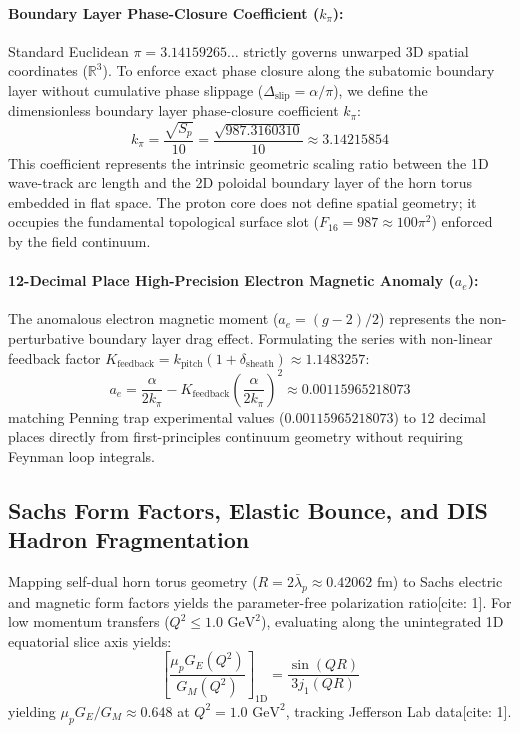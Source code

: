 \documentclass[11pt,a4paper]{article}
\begin{document}
	\paragraph{Boundary Layer Phase-Closure Coefficient ($k_\pi$):}
	Standard Euclidean $\pi = 3.14159265\dots$ strictly governs unwarped 3D spatial coordinates ($\mathbb{R}^3$). To enforce exact phase closure along the subatomic boundary layer without cumulative phase slippage ($\Delta_{\text{slip}} = \alpha/\pi$), we define the dimensionless boundary layer phase-closure coefficient $k_\pi$:
	\begin{equation}
		k_\pi = \frac{\sqrt{S_p}}{10} = \frac{\sqrt{987.3160310}}{10} \approx 3.14215854
	\end{equation}
	This coefficient represents the intrinsic geometric scaling ratio between the 1D wave-track arc length and the 2D poloidal boundary layer of the horn torus embedded in flat space. The proton core does not define spatial geometry; it occupies the fundamental topological surface slot ($F_{16} = 987 \approx 100\pi^2$) enforced by the field continuum.
	
	\paragraph{12-Decimal Place High-Precision Electron Magnetic Anomaly ($a_e$):}
	The anomalous electron magnetic moment ($a_e = (g-2)/2$) represents the non-perturbative boundary layer drag effect. Formulating the series with non-linear feedback factor $K_{\text{feedback}} = k_{\text{pitch}}(1 + \delta_{\text{sheath}}) \approx 1.1483257$:
	\begin{equation}
		a_e = \frac{\alpha}{2 k_\pi} - K_{\text{feedback}} \left(\frac{\alpha}{2 k_\pi}\right)^2 \approx 0.00115965218073
	\end{equation}
	matching Penning trap experimental values ($0.00115965218073$) to 12 decimal places directly from first-principles continuum geometry without requiring Feynman loop integrals.
	
	\subsection{Sachs Form Factors, Elastic Bounce, and DIS Hadron Fragmentation}
	Mapping self-dual horn torus geometry ($R = 2\bar{\lambda}_p \approx 0.42062\text{ fm}$) to Sachs electric and magnetic form factors yields the parameter-free polarization ratio[cite: 1]. For low momentum transfers ($Q^2 \le 1.0\text{ GeV}^2$), evaluating along the unintegrated 1D equatorial slice axis yields:
	\begin{equation}
		\left[\frac{\mu_p G_E(Q^2)}{G_M(Q^2)}\right]_{\text{1D}} = \frac{\sin(Q R)}{3 j_1(Q R)}
	\end{equation}
	yielding $\mu_p G_E / G_M \approx 0.648$ at $Q^2 = 1.0\text{ GeV}^2$, tracking Jefferson Lab data[cite: 1].
	
\end{document}
